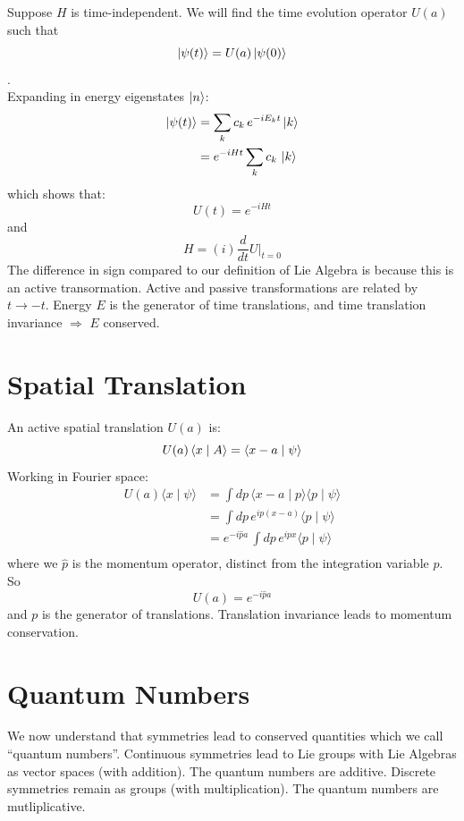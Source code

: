 \documentclass[12pt]{article}
\begin{document}
Suppose $H$ is time-independent. We will find the time evolution
operator $U(a)$ such that
$$\ket{\psi(t)} = U(a)\ket{\psi(0)}$$.\\[6pt]
Expanding in energy eigenstates $\ket{n}$:
\begin{align*}
  \ket{\psi(t)} &= \sum_k c_k\,e^{-iE_k t}\ket{k}\\
  &= e^{-i H t} \sum_k c_k\,\ket{k}
\end{align*}
which shows that:
$$U(t) = e^{-i H t}$$
and 
\begin{equation*}
  H = (i)\frac{d}{dt}U\Big|_{t=0}
\end{equation*}
The difference in sign compared to our definition of Lie Algebra is
because this is an active transormation.  Active and passive
transformations are related by $t \to -t$.
Energy $E$ is the generator of time translations, and time translation
invariance $\Rightarrow$ $E$ conserved.

\section*{Spatial Translation}
An active spatial translation $U(a)$ is:
$$U(a) \braket{x \mid A} = \braket {x-a \mid \psi }$$
Working in Fourier space:
\begin{align*}
  U(a)\langle x\mid\psi\rangle
  &= \int dp\,\langle x-a \mid p\rangle\langle p\mid\psi\rangle \\
  &= \int dp\,e^{ip(x-a)}\langle p\mid\psi\rangle \\
  &= e^{-i\hat{p}a}\,\int dp\,e^{ipx}\langle p\mid\psi\rangle \\
\end{align*}
where we $\hat{p}$ is the momentum operator, distinct from the integration variable $p$.  So
\begin{equation*}
  U(a) = e^{-i\hat{p}a}
\end{equation*}
and $p$ is the generator of translations.  Translation invariance
leads to momentum conservation.

\section*{Quantum Numbers}

We now understand that symmetries lead to conserved quantities which
we call ``quantum numbers''. Continuous symmetries lead to Lie groups
with Lie Algebras as vector spaces (with addition).  The quantum
numbers are additive.  Discrete symmetries remain as groups (with
multiplication).  The quantum numbers are mutliplicative.
\end{document}
